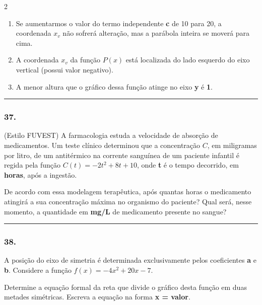 \documentclass[twoside, 10pt, a4paper]{article}
\newlength{\espacoPreQuestao}
\newlength{\espacoQuestao}
\begin{document}
\begin{multicols*}{2}
\begin{enumerate}[label=\Roman*.]
    \item Se aumentarmos o valor do termo independente \textbf{c} de 10 para 20, a coordenada $x_v$ não sofrerá alteração, mas a parábola inteira se moverá para cima.
    \item A coordenada $x_v$ da função $P(x)$ está localizada do lado esquerdo do eixo vertical (possui valor negativo).
    \item A menor altura que o gráfico dessa função atinge no eixo \textbf{y} é \textbf{1}.
\end{enumerate}
\par\vspace{\espacoQuestao}

\noindent\textcolor{CorLinha}{\rule{\linewidth}{0.5pt}} 
\par\vspace{\espacoPreQuestao}
\subsubsection*{37.} (Estilo FUVEST) A farmacologia estuda a velocidade de absorção de medicamentos. Um teste clínico determinou que a concentração $C$, em miligramas por litro, de um antitérmico na corrente sanguínea de um paciente infantil é regida pela função $C(t) = -2t^2 + 8t + 10$, onde \textbf{t} é o tempo decorrido, em \textbf{horas}, após a ingestão.

De acordo com essa modelagem terapêutica, após quantas horas o medicamento atingirá a sua concentração máxima no organismo do paciente? Qual será, nesse momento, a quantidade em \textbf{mg/L} de medicamento presente no sangue?
\par\vspace{\espacoQuestao}

\noindent\textcolor{CorLinha}{\rule{\linewidth}{0.5pt}} 
\par\vspace{\espacoPreQuestao}
\subsubsection*{38.} A posição do eixo de simetria é determinada exclusivamente pelos coeficientes \textbf{a} e \textbf{b}. Considere a função $f(x) = -4x^2 + 20x - 7$.

Determine a equação formal da reta que divide o gráfico desta função em duas metades simétricas. Escreva a equação na forma \textbf{x = valor}.
\par\vspace{\espacoQuestao}


\end{multicols*}
\end{document}
